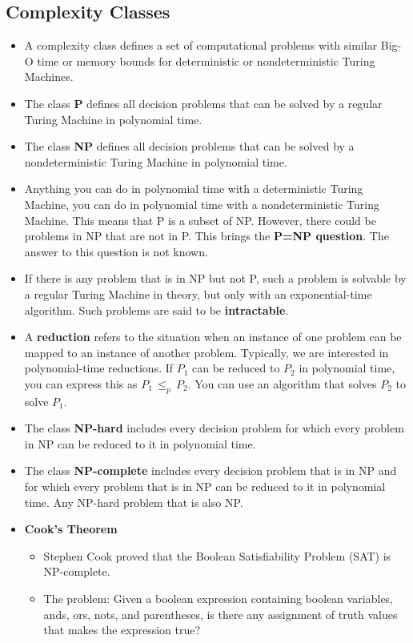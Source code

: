 \documentclass{article}
\begin{document}
\subsection*{Complexity Classes}
\begin{itemize}
    \item A complexity class defines a set of computational problems with similar Big-O time or memory bounds for deterministic or nondeterministic Turing Machines.
    \item The class \textbf{P} defines all decision problems that can be solved by a regular Turing Machine in polynomial time.
    \item The class \textbf{NP} defines all decision problems that can be solved by a nondeterministic Turing Machine in polynomial time.
    \item Anything you can do in polynomial time with a deterministic Turing Machine, you can do in polynomial time with a nondeterministic Turing Machine. This means that P is a subset of NP. However, there could be problems in NP that are not in P. This brings the \textbf{P=NP question}. The answer to this question is not known.
    \item If there is any problem that is in NP but not P, such a problem is solvable by a regular Turing Machine in theory, but only with an exponential-time algorithm. Such problems are said to be \textbf{intractable}.
    \item A \textbf{reduction} refers to the situation when an instance of one problem can be mapped to an instance of another problem. Typically, we are interested in polynomial-time reductions. If \(P_1\) can be reduced to \(P_2\) in polynomial time, you can express this as \(P_1\,\leq_p\,P_2\). You can use an algorithm that solves \(P_2\) to solve \(P_1\).
    \item The class \textbf{NP-hard} includes every decision problem for which every problem in NP can be reduced to it in polynomial time.
    \item The class \textbf{NP-complete} includes every decision problem that is in NP and for which every problem that is in NP can be reduced to it in polynomial time. Any NP-hard problem that is also NP.
    \item \textbf{Cook's Theorem}
    \begin{itemize}
        \item Stephen Cook proved that the Boolean Satisfiability Problem (SAT) is NP-complete.
        \item The problem: Given a boolean expression containing boolean variables, ands, ors, nots, and parentheses, is there any assignment of truth values that makes the expression true?

\end{itemize}
\end{itemize}
\end{document}
